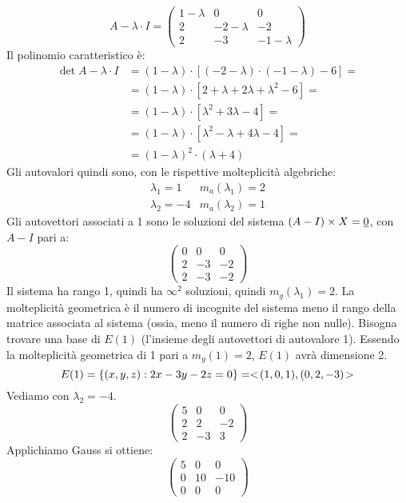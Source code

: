 \begin{exmp}
\[
A - \lambda \cdot I =
\begin{pmatrix}
1-\lambda & 0 & 0 \\
2 & -2-\lambda & -2 \\
2 & -3 & -1-\lambda
\end{pmatrix}
\]
Il polinomio caratteristico \`e:
\begin{align*}
\det{A - \lambda \cdot I} &=
(1 - \lambda) \cdot \left[ (-2 -\lambda) \cdot (-1 - \lambda) - 6 \right] = \\
&= (1 - \lambda) \cdot \left[ 2 + \lambda + 2 \lambda + \lambda^2 - 6 \right] = \\
&= (1 - \lambda) \cdot \left[ \lambda^2 + 3 \lambda - 4 \right] = \\
&= (1 - \lambda) \cdot \left[ \lambda^2 - \lambda + 4 \lambda - 4 \right] = \\
&= (1 - \lambda)^2 \cdot (\lambda + 4)
\end{align*}
Gli autovalori quindi sono, con le rispettive molteplicit\`a algebriche:
\begin{align*}
\lambda_1 = 1 & m_a(\lambda_1) = 2 \\
\lambda_2 = -4 & m_a(\lambda_2) = 1
\end{align*}
Gli autovettori associati a 1 sono le soluzioni del sistema $(A - I) \times X = \underline{0}$, con $A - I$ pari a:
\[
\begin{pmatrix}
0 & 0 & 0 \\
2 & -3 & -2 \\
2 & -3 & -2
\end{pmatrix}
\]
Il sistema ha rango 1, quindi ha $\infty^2$ soluzioni, quindi $m_g (\lambda_1) = 2$. La molteplicit\`a geometrica \`e il numero di incognite del sistema meno il rango della matrice associata al sistema (ossia, meno il numero di righe non nulle). Bisogna trovare una base di $E(1)$ (l'insieme degli autovettori di autovalore 1). Essendo la molteplicit\`a geometrica di 1 pari a $m_g (1) = 2$, $E(1)$ avr\`a dimensione 2.
\[
E(1) = \{ (x,y,z) : 2x - 3y -2z = 0\} = <\!{(1,0,1), (0, 2, -3)}\!>
\]
Vediamo con $\lambda_2 = -4$.
\[
\begin{pmatrix}
5 & 0 & 0 \\
2 & 2 & -2 \\
2 & -3 & 3
\end{pmatrix}
\]
Applichiamo Gauss si ottiene:
\[
\begin{pmatrix}
5 & 0 & 0 \\
0 & 10 & -10 \\
0 & 0 & 0
\end{pmatrix}
\]
\end{exmp}
